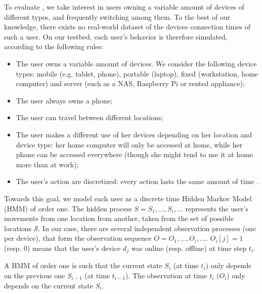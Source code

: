 To evaluate \name, we take interest in users owning a variable amount of devices of different types, and frequently switching among them.
To the best of our knowledge, there exists no real-world dataset of the devices connection times of such a user.
On our testbed, each user's behavior is therefore simulated, according to the following rules:
\begin{itemize}
  \item The user owns a variable amount of devices. We consider the following device types: mobile (e.g. tablet, phone), portable (laptop), fixed (workstation, home computer) and server (such as a NAS, Raspberry Pi or rented appliance);
  \item The user always owns a phone;
	\item The user can travel between different locations;
	\item The user makes a different use of her devices depending on her location and device type: 
  her home computer will only be accessed at home, while her phone can be accessed everywhere (though she might tend to use it at home more than at work);
  \item The user's action are discretized: every action lasts the same amount of time \tuser.
\end{itemize}

Towards this goal, we model each user as a discrete time Hidden Markov Model (HMM) of order one. 
The hidden process $S=S_1, \dots, S_i, \dots$ represents the user's movements from one location from another, 
taken from the set of possible locations $\mathcal{S}$.
In our case, there are several independent observation processes (one per device), 
that form the observation sequence $O= O_1, \dots, O_i, \dots$.
$O_i[j]=1$ (resp. 0) means that the user's device $d_j$ was online (resp. offline) at time step $t_i$.

A HMM of order one is such that the current state $S_i$ (at time $t_i$) only depends on the previous one $S_{i-1}$ (at time $t_{i-1}$).
The observation at time $t_i$ ($O_i$) only depends on the current state $S_i$.



